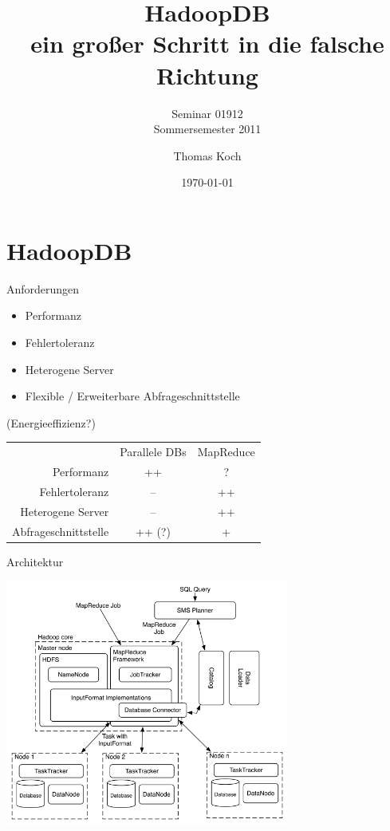 \documentclass{beamer}
\title{HadoopDB\\ ein großer Schritt in die falsche Richtung}
\subtitle[]{Seminar 01912\\ Sommersemester 2011}
\date{\today}
\author[T. Koch]{Thomas Koch}
\institute[Fernuni Hagen]{Lehrgebiet Datenbanksysteme für neue Anwendungen\\ Fernuniversität Hagen}
\begin{document}
  \begin{frame}
    \titlepage
  \end{frame}

  \begin{frame}
    \tableofcontents{}
  \end{frame}

\section{HadoopDB}

\begin{frame}{Anforderungen}
  \begin{itemize}
    \item Performanz
    \item Fehlertoleranz
    \item Heterogene Server
    \item Flexible / Erweiterbare Abfrageschnittstelle
  \end{itemize}
  (Energieeffizienz?)
\end{frame}

\begin{frame}
  \begin{tabular}{r c c}
     & Parallele DBs & MapReduce \\
     Performanz & ++ & ? \\
     Fehlertoleranz & -- & ++ \\
     Heterogene Server & -- & ++ \\
     Abfrageschnittstelle & ++ (?) & + \\
  \end{tabular}
\end{frame}

\begin{frame}{Architektur}
  \begin{center}
    \includegraphics[width=0.7\textwidth]{../ausarbeitung/images/hadoopdb-arch.png}    
  \end{center}
\end{frame}
\end{document}
